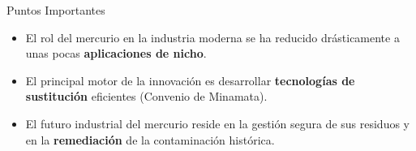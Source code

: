 \begin{frame}{Puntos Importantes}
  \begin{itemize}[<+->]
    \item El rol del mercurio en la industria moderna se ha reducido
      drásticamente a unas pocas \textbf{aplicaciones de nicho}.
    \item El principal motor de la innovación es desarrollar \textbf{tecnologías
      de sustitución} eficientes (Convenio de Minamata).
    \item El futuro industrial del mercurio reside en la gestión segura de sus
      residuos y en la \textbf{remediación} de la contaminación histórica.
  \end{itemize}
\end{frame}

